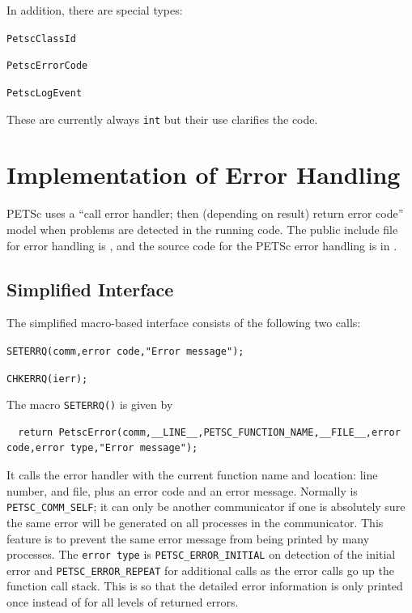 In addition, there are special types:
\begin{tightitemize}
  \item \lstinline{PetscClassId}
  \item \lstinline{PetscErrorCode}
  \item \lstinline{PetscLogEvent}
\end{tightitemize}
These are currently always \lstinline{int} but their use clarifies the code.

\section{Implementation of Error Handling}

PETSc  uses a ``call error handler; then (depending on result) return
error code'' model when problems are detected in the running code.
The public include file for error handling is
 \href{http://www.mcs.anl.gov/petsc/petsc-master/include/petscerror.h.html}{},
 and the source code for the PETSc error handling is in .

\subsection{Simplified Interface}

The simplified macro-based interface consists of the following two calls:
\begin{tightitemize}
  \item \lstinline{SETERRQ(comm,error code,"Error message");}
  \item \lstinline{CHKERRQ(ierr);}
\end{tightitemize}

The macro \lstinline{SETERRQ()} is given by
\begin{lstlisting}
  return PetscError(comm,__LINE__,PETSC_FUNCTION_NAME,__FILE__,error code,error type,"Error message");
\end{lstlisting}
It calls the error handler with the current function name and location: line number,
and file, plus an error code and an error message.
Normally  is \lstinline{PETSC_COMM_SELF}; it can only be another communicator if
one is absolutely sure the same error will be generated on all processes in the communicator.
This feature is to prevent the same error message from being printed by many processes.
The \lstinline{error type} is \lstinline{PETSC_ERROR_INITIAL} on detection of the initial error and \lstinline{PETSC_ERROR_REPEAT} for additional calls as
the error calls go up the function call stack.
This is so that the detailed error information is only printed once instead of for all levels of returned errors.

